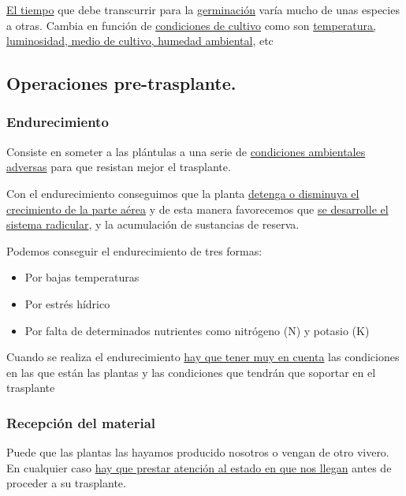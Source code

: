 \documentclass[a4paper,12pt,oneside]{article}
\begin{document}
\uline{El tiempo} que debe transcurrir para la \uline{germinación} varía mucho de unas
especies a otras. Cambia en función de \uline{condiciones de cultivo} como son
\uline{temperatura, luminosidad, medio de cultivo, humedad ambiental}, etc

\subsection{Operaciones pre-trasplante.}
\label{sec:orgb5ee2eb}

\subsubsection{Endurecimiento}
\label{sec:orgf80c99d}
Consiste en someter a las plántulas a una serie de \uline{condiciones ambientales
adversas} para que resistan  mejor el trasplante.

Con el  endurecimiento conseguimos que la planta \uline{detenga o disminuya el
crecimiento de la parte aérea} y de esta manera favorecemos que \uline{se desarrolle
el sistema radicular}, y la acumulación de sustancias de reserva. 

Podemos conseguir el endurecimiento de tres formas:
\begin{itemize}
\item Por bajas temperaturas
\item Por estrés hídrico
\item Por falta de determinados nutrientes como nitrógeno (N) y potasio (K)
\end{itemize}

Cuando se realiza el endurecimiento \uline{hay que tener muy en cuenta} las
condiciones en las que están las plantas y las condiciones que tendrán que
soportar en el trasplante
\subsubsection{Recepción del material}
\label{sec:org7d42437}
Puede que las plantas las hayamos producido nosotros o vengan de otro
vivero. En cualquier caso \uline{hay que prestar atención al estado en que nos
llegan} antes de proceder a su trasplante.
\end{document}

